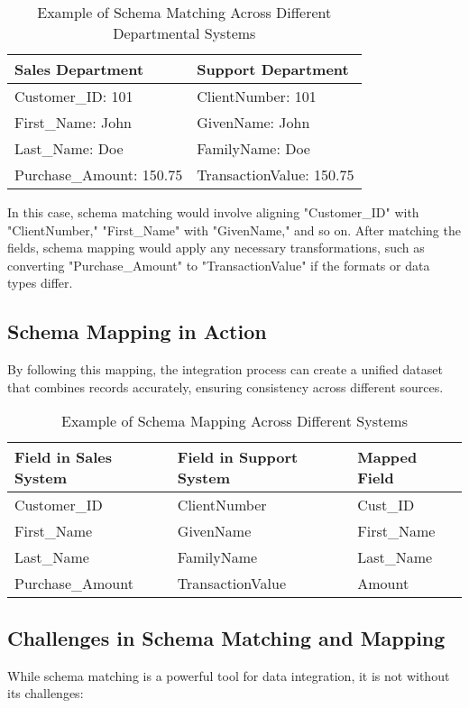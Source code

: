 \documentclass[12pt]{article}
\begin{document}
\begin{table}[h]
    \centering
    \begin{tabular}{|p{6cm}|p{6cm}|}
        \hline
        \textbf{Sales Department} & \textbf{Support Department} \\ \hline
        Customer\_ID: 101 & ClientNumber: 101 \\ \hline
        First\_Name: John & GivenName: John \\ \hline
        Last\_Name: Doe & FamilyName: Doe \\ \hline
        Purchase\_Amount: 150.75 & TransactionValue: 150.75 \\ \hline
    \end{tabular}
    \caption{Example of Schema Matching Across Different Departmental Systems}
\end{table}

In this case, schema matching would involve aligning "Customer\_ID" with "ClientNumber," "First\_Name" with "GivenName," and so on. After matching the fields, schema mapping would apply any necessary transformations, such as converting "Purchase\_Amount" to "TransactionValue" if the formats or data types differ.

\subsection{Schema Mapping in Action}
By following this mapping, the integration process can create a unified dataset that combines records accurately, ensuring consistency across different sources.

\begin{table}[h]
    \centering
    \begin{tabular}{|p{5cm}|p{5cm}|p{5cm}|}
        \hline
        \textbf{Field in Sales System} & \textbf{Field in Support System} & \textbf{Mapped Field} \\ \hline
        Customer\_ID & ClientNumber & Cust\_ID \\ \hline
        First\_Name & GivenName & First\_Name \\ \hline
        Last\_Name & FamilyName & Last\_Name \\ \hline
        Purchase\_Amount & TransactionValue & Amount \\ \hline
    \end{tabular}
    \caption{Example of Schema Mapping Across Different Systems}
\end{table}

\subsection{Challenges in Schema Matching and Mapping}
While schema matching is a powerful tool for data integration, it is not without its challenges:
\end{document}
